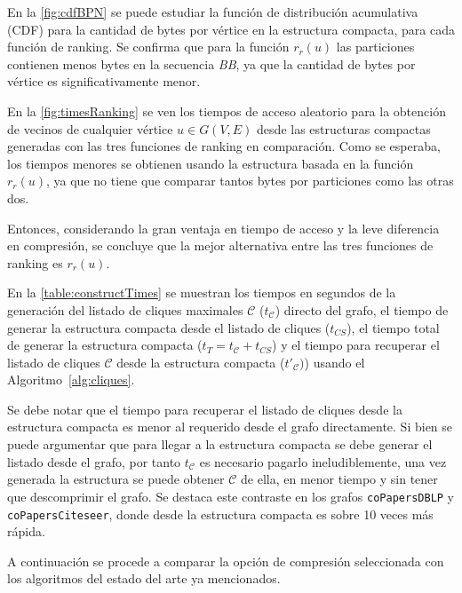 


En la \autoref{fig:cdfBPN} se puede estudiar la función de distribución acumulativa (CDF) para la cantidad de bytes por vértice en la estructura compacta, para cada función de ranking. Se confirma que para la función $r_{r}(u)$ las particiones contienen menos bytes en la secuencia \textit{BB}, ya que la cantidad de bytes por vértice es significativamente menor.




En la \autoref{fig:timesRanking} se ven los tiempos de acceso aleatorio para la obtención de vecinos de cualquier vértice $u \in G(V, E)$ desde las estructuras compactas generadas con las tres funciones de ranking en comparación. Como se esperaba, los tiempos menores se obtienen usando la estructura basada en la función $r_{r}(u)$, ya que no tiene que comparar tantos bytes por particiones como las otras dos.



Entonces, considerando la gran ventaja en tiempo de acceso y la leve diferencia en compresión, se concluye que la mejor alternativa entre las tres funciones de ranking es $r_{r}(u)$. 

En la \autoref{table:constructTimes} se muestran los tiempos en segundos de la generación del listado de cliques maximales $\mathcal{C}$ ($t_{\mathcal{C}}$) directo del grafo, el tiempo de generar la estructura compacta desde el listado de cliques ($t_{CS}$), el tiempo total de generar la estructura compacta ($t_{T} = t_{\mathcal{C}} + t_{CS}$) y el tiempo para recuperar el listado de cliques $\mathcal{C}$ desde la estructura compacta ($t'_{\mathcal{C}})$) usando el Algoritmo~\ref{alg:cliques}. 

Se debe notar que el tiempo para recuperar el listado de cliques desde la estructura compacta es menor al requerido desde el grafo directamente. Si bien se puede argumentar que para llegar a la estructura compacta se debe generar el listado desde el grafo, por tanto $t_{\mathcal{C}}$ es necesario pagarlo ineludiblemente, una vez generada la estructura se puede obtener $\mathcal{C}$ de ella, en menor tiempo y sin tener que descomprimir el grafo. Se destaca este contraste en los grafos \texttt{coPapersDBLP} y \texttt{coPapersCiteseer}, donde desde la estructura compacta es sobre 10 veces más rápida.



A continuación se procede a comparar la opción de compresión seleccionada con los algoritmos del estado del arte ya mencionados.




